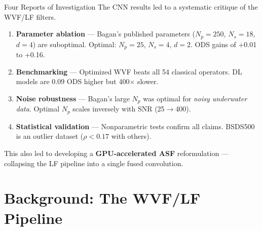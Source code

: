 \documentclass[10pt, aspectratio=169]{beamer}
\begin{document}
\begin{frame}{Four Reports of Investigation}
  The CNN results led to a systematic critique of the WVF/LF filters.

  \vspace{0.3em}
  \begin{enumerate}
    \item \textbf{Parameter ablation} --- Bagan's published parameters ($N_p{=}250$, $N_s{=}18$, $d{=}4$) are suboptimal. Optimal: $N_p{=}25$, $N_s{=}4$, $d{=}2$. ODS gains of +0.01 to +0.16.
    \item \textbf{Benchmarking} --- Optimized WVF beats all 54 classical operators. DL models are 0.09 ODS higher but 400$\times$ slower.
    \item \textbf{Noise robustness} --- Bagan's large $N_p$ was optimal for \textit{noisy underwater data}. Optimal $N_p$ scales inversely with SNR (25$\to$400).
    \item \textbf{Statistical validation} --- Nonparametric tests confirm all claims. BSDS500 is an outlier dataset ($\rho{<}0.17$ with others).
  \end{enumerate}

  \vspace{0.3em}
  This also led to developing a \textbf{GPU-accelerated ASF} reformulation --- collapsing the LF pipeline into a single fused convolution.
\end{frame}

\section{Background: The WVF/LF Pipeline}
\end{document}
